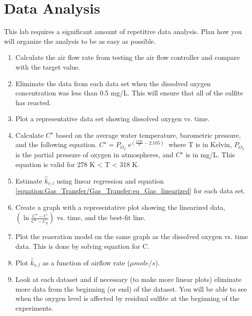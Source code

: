 \documentclass[letterpaper,10pt,english]{sphinxmanual}
\begin{document}
\section{Data Analysis}
\label{\detokenize{Gas_Transfer/Gas_Transfer:data-analysis}}\label{\detokenize{Gas_Transfer/Gas_Transfer:heading-gas-transfer-data-analysis}}
This lab requires a significant amount of repetitive data analysis. Plan how you will organize the analysis to be as easy as possible.
\begin{enumerate}
\item {} 
Calculate the air flow rate from testing the air flow controller and compare with the target value.

\item {} 
Eliminate the data from each data set when the dissolved oxygen concentration was less than 0.5 mg/L. This will ensure that all of the sulfite has reacted.

\item {} 
Plot a representative data set showing dissolved oxygen vs. time.

\item {} 
Calculate \(C^{\star}\) based on the average water temperature, barometric pressure, and the following equation. \(C^{\star} =P_{O_{2}} {\mathop{e}\nolimits^{\left(\frac{1727}{T} -2.105\right)}}\) where T is in Kelvin, \(P_{O_{2} }\) is the partial pressure of oxygen in atmospheres, and \(C^{\star}\) is in mg/L. This equation is valid for 278 K \textless{} T \textless{} 318 K.

\item {} 
Estimate \(\hat{k}_{v,l}\) using linear regression and equation \eqref{equation:Gas_Transfer/Gas_Transfer:eq_Gas_linearized} for each data set.

\item {} 
Create a graph with a representative plot showing the linearized data, \(\left(\ln \frac{C^{\star} -C}{C^{\star} -C_{0} } \right)\) vs. time, and the best-fit line.

\item {} 
Plot the reaeration model on the same graph as the dissolved oxygen vs. time data.  This is done by solving equation for C.

\item {} 
Plot \(\hat{k}_{v,l}\) as a function of airflow rate (\(\mu mole/s\)).

\item {} 
Look at each dataset and if necessary (to make more linear plots) eliminate more data from the beginning (or end) of the dataset. You will be able to see when the oxygen level is affected by residual sulfite at the beginning of the experiments.


\end{enumerate}
\end{document}
